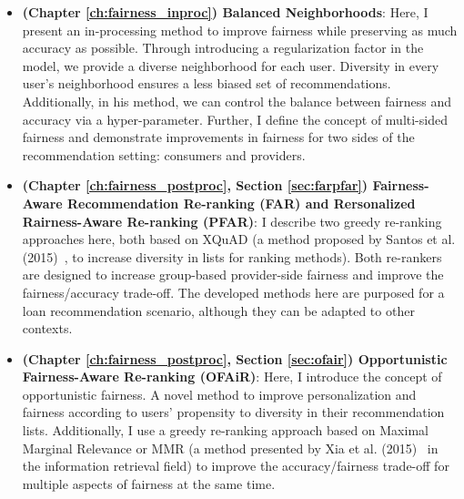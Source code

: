 \begin{itemize}
    \item \textbf{(Chapter \ref{ch:fairness_inproc}) Balanced Neighborhoods}:
    Here, I present an in-processing method to improve fairness while preserving as much accuracy as possible. Through introducing a regularization factor in the model, we provide a diverse neighborhood for each user. Diversity in every user's neighborhood ensures a less biased set of recommendations. Additionally, in his method, we can control the balance between fairness and accuracy via a hyper-parameter. Further, I define the concept of multi-sided fairness and demonstrate improvements in fairness for two sides of the recommendation setting: consumers and providers.
    
    \item \textbf{(Chapter \ref{ch:fairness_postproc}, Section \ref{sec:farpfar}) Fairness-Aware Recommendation Re-ranking (FAR) and Rersonalized Rairness-Aware Re-ranking (PFAR)}: 
    I describe two greedy re-ranking approaches here, both based on XQuAD (a method proposed by Santos et al. (2015)~\cite{santos2015search}, to increase diversity in lists for ranking methods). Both re-rankers are designed to increase group-based provider-side fairness and improve the fairness/accuracy trade-off. The developed methods here are purposed for a loan recommendation scenario, although they can be adapted to other contexts. 
    
    \item \textbf{(Chapter \ref{ch:fairness_postproc}, Section \ref{sec:ofair}) Opportunistic Fairness-Aware Re-ranking (OFAiR)}:
    Here, I introduce the concept of opportunistic fairness. A novel method to improve personalization and fairness according to users' propensity to diversity in their recommendation lists. Additionally, I use a greedy re-ranking approach based on Maximal Marginal Relevance or MMR (a method presented by Xia et al. (2015)~\cite{xia2015learning} in the information retrieval field) to improve the accuracy/fairness trade-off for multiple aspects of fairness at the same time. 

    

\end{itemize}
